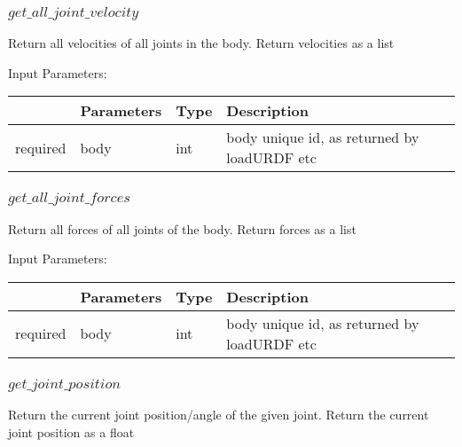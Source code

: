 \documentclass[
	ngerman,
	accentcolor=9c,%
	type=intern,
	marginpar=false
	]{tudapub}
\begin{document}
\subsubsection{$get\_all\_joint\_velocity$}
\noindent  Return all velocities of all joints in the body. Return velocities as a list

\vspace{0.5cm}
\noindent Input Parameters:
\vspace{0.5cm}

\begin{tabular}{|p{}|p{}|p{}| p{}|}
\hline
 & \textbf{Parameters} & \textbf{Type} & \textbf{Description} \\
\hline
required & body & int & body unique id, as returned by loadURDF etc\\
\hline

\end{tabular}
\vspace{0.5cm}





\subsubsection{$get\_all\_joint\_forces$}
\noindent Return all forces of all joints of the body.  Return forces as a list

\vspace{0.5cm}
\noindent Input Parameters:
\vspace{0.5cm}

\begin{tabular}{|p{}|p{}|p{}| p{}|}
\hline
 & \textbf{Parameters} & \textbf{Type} & \textbf{Description} \\
\hline
required & body & int & body unique id, as returned by loadURDF etc\\
\hline

\end{tabular}
\vspace{0.5cm}








\subsubsection{$get\_joint\_position$}
\noindent Return the current joint position/angle of the given joint. Return the current joint position as a float
\end{document}
